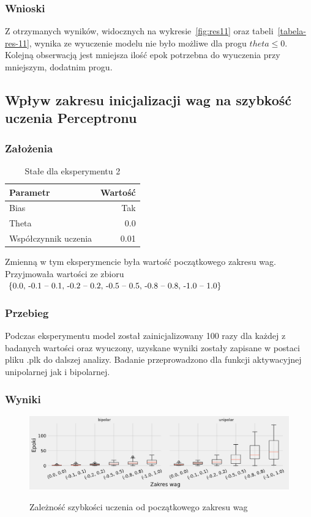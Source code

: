 \documentclass{article}
\begin{document}
\subsubsection*{Wnioski}

Z otrzymanych wyników, widocznych na wykresie~\ref{fig:res11} oraz tabeli~\ref{tabela-res-11}, wynika ze wyuczenie modelu nie było możliwe dla progu \(theta \leq  0 \). Kolejną obserwacją jest mniejsza ilość epok potrzebna do wyuczenia przy mniejszym, dodatnim progu.

\newpage
\subsection{Wpływ zakresu inicjalizacji wag na szybkość uczenia Perceptronu}
\subsubsection*{Założenia}
\begin{table}[!h]
	\caption{Stałe dla eksperymentu 2}
	\label{tabela-const-2}
	\centering
	\begin{tabular}{lr}
		\toprule
		Parametr               & Wartość \\
		\midrule
		Bias                   & Tak       \\
		Theta                  & 0.0       \\
		Współczynnik uczenia & 0.01      \\
		\bottomrule
	\end{tabular}
\end{table}

Zmienną w tym eksperymencie była wartość początkowego zakresu wag. Przyjmowała wartości ze zbioru \(\{$0.0, -0.1 -- 0.1, -0.2 -- 0.2, -0.5 -- 0.5, -0.8 -- 0.8, -1.0 -- 1.0$\}\)
\subsubsection*{Przebieg}

Podczas eksperymentu model został zainicjalizowany 100 razy dla każdej z badanych wartości oraz wyuczony, uzyskane wyniki zostały zapisane w postaci pliku .plk do dalszej analizy. Badanie przeprowadzono dla funkcji aktywacyjnej unipolarnej jak i bipolarnej.

\subsubsection*{Wyniki}
\begin{figure}[!h]
	\centering
	\caption{Zależność szybkości uczenia od początkowego zakresu wag}
	\includegraphics[width=\textwidth]{per_w.png}
	\label{fig:res2}
\end{figure}
\end{document}
